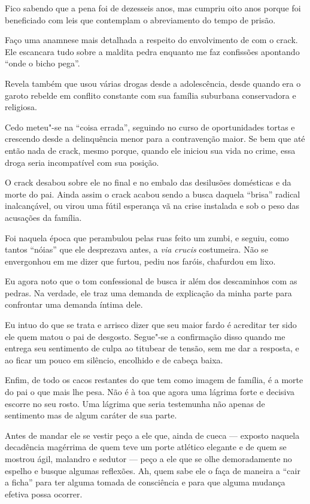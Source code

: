 Fico sabendo que a pena foi de dezesseis anos, mas  cumpriu oito anos
porque foi beneficiado com leis que contemplam o abreviamento do tempo
de prisão.

\asterisc{}

Faço uma anamnese mais detalhada a respeito do envolvimento de  com o
crack. Ele escancara tudo sobre a maldita pedra enquanto me faz
confissões apontando ``onde o bicho pega''.

Revela também que usou várias drogas desde a adolescência, desde quando
era o garoto rebelde em conflito constante com sua família suburbana
conservadora e religiosa.

Cedo meteu"-se na ``coisa errada'', seguindo no curso de oportunidades
tortas e crescendo desde a delinquência menor para a contravenção maior.
Se bem que até então nada de crack, mesmo porque, quando ele iniciou sua
vida no crime, essa droga seria incompatível com sua posição.

O crack desabou sobre ele no final e no embalo das desilusões domésticas
e da morte do pai. Ainda assim o crack acabou sendo a busca daquela
``brisa'' radical inalcançável, ou virou uma fútil esperança vã na crise
instalada e sob o peso das acusações da família.

Foi naquela época que  perambulou pelas ruas feito um zumbi, e seguiu,
como tantos ``nóias'' que ele desprezava antes, a \emph{via crucis}
costumeira. Não se envergonhou em me dizer que furtou, pediu nos faróis,
chafurdou em lixo.

Eu agora noto que o tom confessional de  busca ir além dos descaminhos
com as pedras. Na verdade, ele traz uma demanda de explicação da minha
parte para confrontar uma demanda íntima dele.

Eu intuo do que se trata e arrisco dizer que seu maior fardo é acreditar
ter sido ele quem matou o pai de desgosto. Segue"-se a confirmação disso
quando  me entrega seu sentimento de culpa ao titubear de tensão, sem
me dar a resposta, e ao ficar um pouco em silêncio, encolhido e de
cabeça baixa.

Enfim, de todo os cacos restantes do que  tem como imagem de família,
é a morte do pai o que mais lhe pesa. Não é à toa que agora uma lágrima
forte e decisiva escorre no seu rosto. Uma lágrima que seria testemunha
não apenas de sentimento mas de algum caráter de sua parte.

Antes de mandar ele se vestir peço a ele que, ainda de cueca --- exposto
naquela decadência magérrima de quem teve um porte atlético elegante e
de quem se mostrou ágil, malandro e sedutor --- peço a ele que se olhe
demoradamente no espelho e busque algumas reflexões. Ah, quem sabe ele o
faça de maneira a ``cair a ficha'' para ter alguma tomada de consciência
e para que alguma mudança efetiva possa ocorrer.

